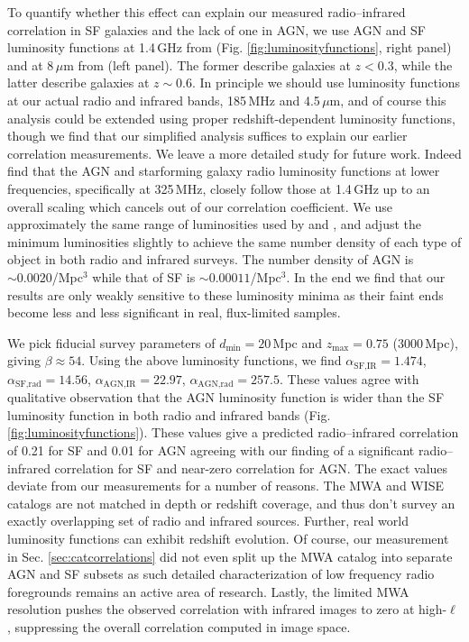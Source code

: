 \documentclass[numberedappendix]{emulateapj}
\newcommand{\mintext}{\text{min}}
\newcommand{\maxtext}{\text{max}}
\begin{document}
To quantify whether this effect can explain our measured radio--infrared correlation in SF galaxies and the lack of one in AGN, we use AGN and SF luminosity functions at 1.4\,GHz from \citet{mauch07} (Fig. \ref{fig:luminosityfunctions}, right panel) and at 8\,$\mu$m from \citet{fu10} (left panel). The former describe galaxies at $z<0.3$, while the latter describe galaxies at $z\sim0.6$. In principle we should use luminosity functions at our actual radio and infrared bands, 185\,MHz and 4.5\,$\mu$m, and of course this analysis could be extended using proper redshift-dependent luminosity functions, though we find that our simplified analysis suffices to explain our earlier correlation measurements. We leave a more detailed study for future work. Indeed \citet{prescott16} find that the AGN and starforming galaxy radio luminosity functions at lower frequencies, specifically at 325\,MHz, closely follow those at 1.4\,GHz up to an overall scaling which cancels out of our correlation coefficient. We use approximately the same range of luminosities used by \citet{mauch07} and \citet{fu10}, and adjust the minimum luminosities slightly to achieve the same number density of each type of object in both radio and infrared surveys. The number density of AGN is $\sim0.0020$/Mpc$^3$ while that of SF is $\sim0.00011$/Mpc$^3$. In the end we find that our results are only weakly sensitive to these luminosity minima as their faint ends become less and less significant in real, flux-limited samples. 

We pick fiducial survey parameters of $d_\mintext=20$\,Mpc and $z_\maxtext=0.75$ (3000\,Mpc), giving $\beta\approx54$.  Using the above luminosity functions, we find $\alpha_{\text{SF,IR}}=1.474$, $\alpha_{\text{SF,rad}}=14.56$, $\alpha_{\text{AGN,IR}}=22.97$, $\alpha_{\text{AGN,rad}}=257.5$. These values agree with qualitative observation that the AGN luminosity function is wider than the SF luminosity function in both radio and infrared bands (Fig. \ref{fig:luminosityfunctions}). These values give a predicted radio--infrared correlation of 0.21 for SF and 0.01 for AGN agreeing with our finding of a significant radio--infrared correlation for SF and near-zero correlation for AGN. The exact values deviate from our measurements for a number of reasons. The MWA and WISE catalogs are not matched in depth or redshift coverage, and thus don't survey an exactly overlapping set of radio and infrared sources. Further, real world luminosity functions can exhibit redshift evolution. Of course, our measurement in Sec. \ref{sec:catcorrelations} did not even split up the MWA catalog into separate AGN and SF subsets as such detailed characterization of low frequency radio foregrounds remains an active area of research. Lastly, the limited MWA resolution pushes the observed correlation with infrared images to zero at high-$\ell$, suppressing the overall correlation computed in image space.
\end{document}
